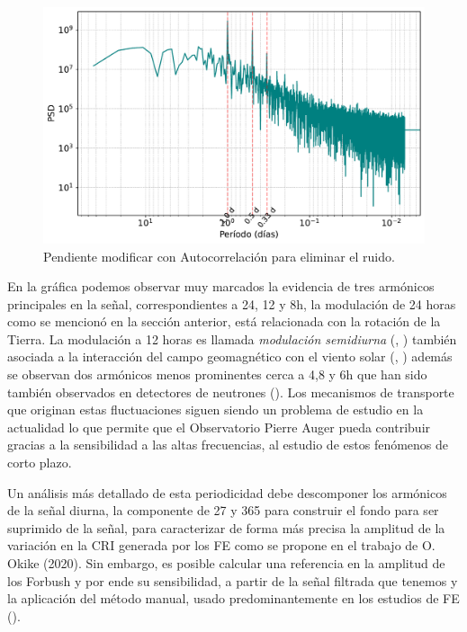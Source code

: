 \begin{figure}
\centering
\includegraphics[width=1\linewidth]{Figs/Figr/forbush_difference_FFT.pdf}
    \caption{Pendiente modificar con Autocorrelación para eliminar el ruido.}
    \label{forbush_filter}
    \end{figure}
    En la gráfica podemos observar muy marcados la evidencia de tres armónicos principales en la señal, correspondientes a 24, 12 y 8h, la modulación de 24 horas como se mencionó en la sección anterior, está relacionada con la rotación de la Tierra. La modulación a 12 horas es llamada \textit{modulación semidiurna} (\cite{nicolson_1948}, \cite{grieder_2001}) también asociada a la interacción del campo geomagnético con el viento solar (\cite{singh_2015}, \cite{sarabhai_1953}) además se observan dos armónicos menos prominentes cerca a 4,8 y 6h que han sido también observados en  detectores de neutrones (\cite{shalaby_2022}). Los mecanismos de transporte que originan estas fluctuaciones siguen siendo un problema de estudio en la actualidad lo que permite que el Observatorio Pierre Auger pueda contribuir  gracias a la sensibilidad a las altas frecuencias, al estudio de estos fenómenos de corto plazo.

Un análisis más detallado de esta periodicidad debe descomponer los armónicos de la señal diurna, la componente de 27 y 365 para construir el fondo para ser suprimido de la señal, para caracterizar de forma más precisa la amplitud de la variación en la CRI generada por los FE como se propone en el trabajo de O. Okike (2020). Sin embargo, es posible calcular una referencia en la amplitud de los Forbush y por ende su sensibilidad, a partir de la señal filtrada que tenemos y la aplicación del método manual, usado predominantemente en los estudios de FE (\cite{okike_2020}). 

